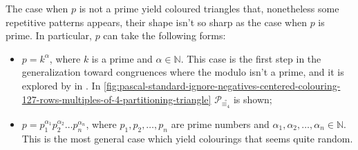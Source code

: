 The case when $p$ is not a prime yield coloured triangles that, nonetheless some 
repetitive patterns appears, their shape isn't so sharp as the case when $p$ is prime.
In particular, $p$ can take the following forms: 
\begin{itemize}
    \item $p=k^{\alpha}$, where $k$ is a prime and $\alpha\in\mathbb{N}$. This case
        is the first step in the generalization toward congruences where the modulo 
        isn't a prime, and it is explored by \citeauthor{mclean:1974} in \cite{mclean:1974}.
        In \autoref{fig:pascal-standard-ignore-negatives-centered-colouring-127-rows-multiples-of-4-partitioning-triangle} 
        $\mathcal{P}_{\stackrel{\circ}{\equiv_{4}}}$ is shown;
    \item $p=p_{1}^{\alpha_{1}}p_{2}^{\alpha_{2}}\ldots p_{n}^{\alpha_{n}}$, where $p_{1},p_{2},\ldots,p_{n}$ 
        are prime numbers and $\alpha_{1},\alpha_{2},\ldots,\alpha_{n}\in\mathbb{N}$. This is the most general case
        which yield colourings that seems quite random.
\end{itemize}

